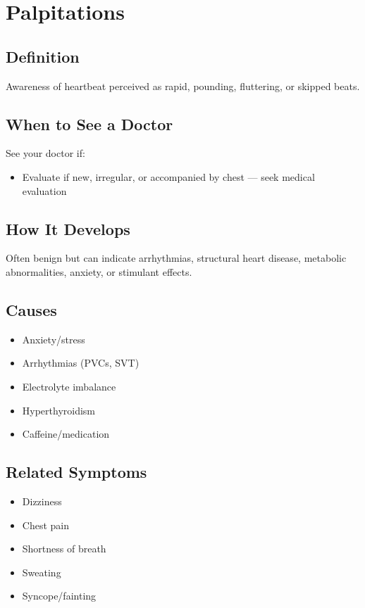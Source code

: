 \chapter{Palpitations}

\section*{Definition}
Awareness of heartbeat perceived as rapid, pounding, fluttering, or skipped beats.

\section*{When to See a Doctor}
See your doctor if:
\begin{itemize}
  \item Evaluate if new, irregular, or accompanied by chest — seek medical evaluation
\end{itemize}

\section*{How It Develops}
Often benign but can indicate arrhythmias, structural heart disease, metabolic abnormalities, anxiety, or stimulant effects.

\section*{Causes}
\begin{itemize}
  \item Anxiety/stress
  \item Arrhythmias (PVCs, SVT)
  \item Electrolyte imbalance
  \item Hyperthyroidism
  \item Caffeine/medication
\end{itemize}

\section*{Related Symptoms}
\begin{itemize}
  \item Dizziness
  \item Chest pain
  \item Shortness of breath
  \item Sweating
  \item Syncope/fainting
\end{itemize}

